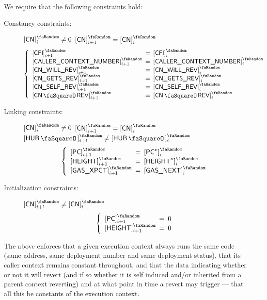 We require that the following constraints hold:
\begin{description}
	\item[Constancy constraints:] 
		\If $\order{\cn}_{i} \neq 0$ \et $\order{\cn}_{i + 1} = \order{\cn}_{i}$ \Then
		\[
			\left\{ \begin{array}{lcl}
				\order{\cfi          } _{i + 1} & \!\!\! = \!\!\! & \order{\cfi        } _{i} \\
				\order{\caller       } _{i + 1} & \!\!\! = \!\!\! & \order{\caller     } _{i} \\
				\order{\cnWillRev    } _{i + 1} & \!\!\! = \!\!\! & \order{\cnWillRev  } _{i} \\
				\order{\cnGetsRev    } _{i + 1} & \!\!\! = \!\!\! & \order{\cnGetsRev  } _{i} \\
				\order{\cnSelfRev    } _{i + 1} & \!\!\! = \!\!\! & \order{\cnSelfRev  } _{i} \\
				\order{\cnRevStamp   } _{i + 1} & \!\!\! = \!\!\! & \order{\cnRevStamp } _{i} \\
			\end{array} \right.
		\]
	\item[Linking constraints:] 
		\If $\order{\cn}_{i} \neq 0$ \et $\order{\cn}_{i + 1} = \order{\cn}_{i}$ \et $\order{\hubStamp}_{i + 1} \neq \order{\hubStamp}_{i}$ \Then
		\[
			\left\{ \begin{array}{lcl}
				\order{\pc           } _{i + 1} & \!\!\! = \!\!\! & \order{\pc\new     } _{i} \\
				\order{\height       } _{i + 1} & \!\!\! = \!\!\! & \order{\height\new } _{i} \\
				\order{\gasExpected  } _{i + 1} & \!\!\! = \!\!\! & \order{\gasNext    } _{i} \\
			\end{array} \right.
		\]
	\item[Initialization constraints:] 
		\If $\order{\cn}_{i + 1} \neq \order{\cn}_{i}$ \Then
		\[
			\left\{ \begin{array}{lcl}
				\order{\pc           } _{i + 1} & \!\!\! = \!\!\! & 0 \\
				\order{\height       } _{i + 1} & \!\!\! = \!\!\! & 0 \\
			\end{array} \right.
		\]
\end{description}
The above enforces that a given execution context always runs the same code (same address, same deployment number and same deployment status), that its caller context remains constant throughout, and that the data indicating whether or not it will revert (and if so whether it is self induced and/or inherited from a parent context reverting) and at what point in time a revert may trigger --- that all this be constants of the execution context.
